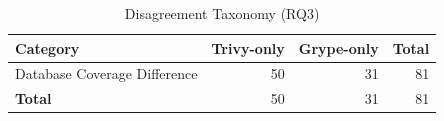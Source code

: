 \begin{table}[htbp]
\caption{Disagreement Taxonomy (RQ3)}
\label{tab:disagreement-taxonomy}
\centering\small
\begin{tabular}{lrrr}
\toprule
\textbf{Category} & \textbf{Trivy-only} & \textbf{Grype-only} & \textbf{Total} \\
\midrule
  Database Coverage Difference & 50 & 31 & 81 \\
\midrule
  \textbf{Total} & 50 & 31 & 81 \\
\bottomrule
\end{tabular}
\end{table}